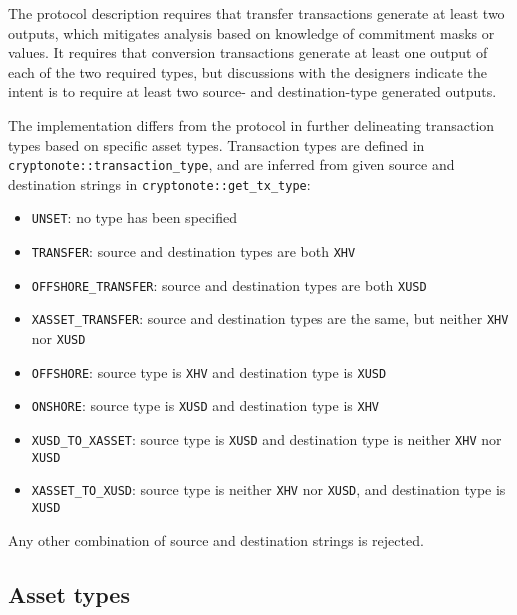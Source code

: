 \documentclass{article}
\begin{document}
The protocol description requires that transfer transactions generate at least two outputs, which mitigates analysis based on knowledge of commitment masks or values.
It requires that conversion transactions generate at least one output of each of the two required types, but discussions with the designers indicate the intent is to require at least two source- and destination-type generated outputs.

The implementation differs from the protocol in further delineating transaction types based on specific asset types.
Transaction types are defined in \texttt{cryptonote::transaction\_type}, and are inferred from given source and destination strings in \texttt{cryptonote::get\_tx\_type}:
\begin{itemize}
	\item \texttt{UNSET}: no type has been specified
	\item \texttt{TRANSFER}: source and destination types are both \texttt{XHV}
	\item \texttt{OFFSHORE\_TRANSFER}: source and destination types are both \texttt{XUSD}
	\item \texttt{XASSET\_TRANSFER}: source and destination types are the same, but neither \texttt{XHV} nor \texttt{XUSD}
	\item \texttt{OFFSHORE}: source type is \texttt{XHV} and destination type is \texttt{XUSD}
	\item \texttt{ONSHORE}: source type is \texttt{XUSD} and destination type is \texttt{XHV}
	\item \texttt{XUSD\_TO\_XASSET}: source type is \texttt{XUSD} and destination type is neither \texttt{XHV} nor \texttt{XUSD}
	\item \texttt{XASSET\_TO\_XUSD}: source type is neither \texttt{XHV} nor \texttt{XUSD}, and destination type is \texttt{XUSD}
\end{itemize}
Any other combination of source and destination strings is rejected.


\subsection{Asset types}
\end{document}
